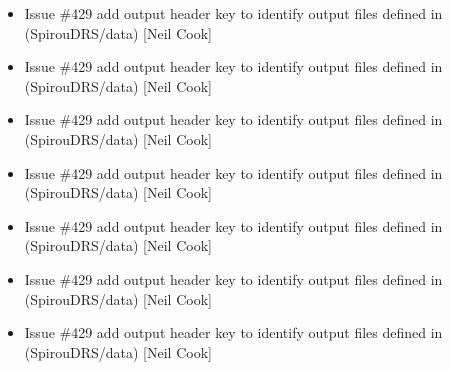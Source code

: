 \documentclass[a4paper,10pt,english]{report}
\begin{document}
\begin{itemize}
\item {} 
Issue \#429 \sphinxhyphen{} add output header key to identify output files
 \sphinxhyphen{} defined in  (SpirouDRS/data) {[}Neil Cook{]}

\item {} 
Issue \#429 \sphinxhyphen{} add output header key to identify output files
 \sphinxhyphen{} defined in  (SpirouDRS/data) {[}Neil Cook{]}

\item {} 
Issue \#429 \sphinxhyphen{} add output header key to identify output files
 \sphinxhyphen{} defined in  (SpirouDRS/data) {[}Neil Cook{]}

\item {} 
Issue \#429 \sphinxhyphen{} add output header key to identify output files
 \sphinxhyphen{} defined in  (SpirouDRS/data) {[}Neil Cook{]}

\item {} 
Issue \#429 \sphinxhyphen{} add output header key to identify output files
 \sphinxhyphen{} defined in  (SpirouDRS/data) {[}Neil Cook{]}

\item {} 
Issue \#429 \sphinxhyphen{} add output header key to identify output files
 \sphinxhyphen{} defined in  (SpirouDRS/data) {[}Neil Cook{]}

\item {} 
Issue \#429 \sphinxhyphen{} add output header key to identify output files
 \sphinxhyphen{} defined in  (SpirouDRS/data) {[}Neil Cook{]}

\end{itemize}
\end{document}
